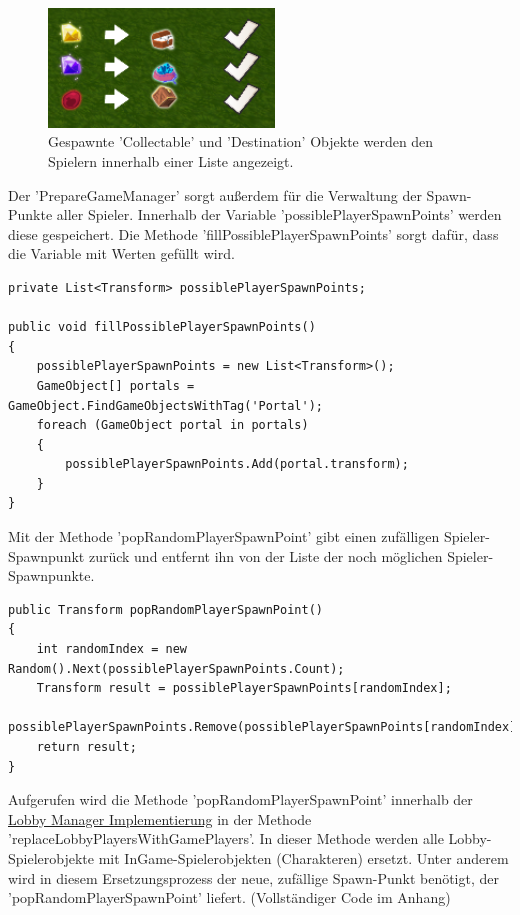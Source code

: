 \begin{figure}[H]
	\centering
	\includegraphics[width=60mm]{images/prototyp_task_list.png}
	\caption[Initial Task List]{Gespawnte 'Collectable' und 'Destination' Objekte werden den Spielern innerhalb einer Liste angezeigt.}
	\label{pic:prototyp_task_list}
\end{figure}

Der 'PrepareGameManager' sorgt außerdem für die Verwaltung der Spawn-Punkte aller Spieler. Innerhalb der Variable 'possiblePlayerSpawnPoints' werden diese gespeichert. Die Methode 'fillPossiblePlayerSpawnPoints' sorgt dafür, dass die Variable mit Werten gefüllt wird.

\begin{lstlisting}[caption= PrepareGameManager.cs fillPossiblePlayerSpawnPoints()]
private List<Transform> possiblePlayerSpawnPoints;

public void fillPossiblePlayerSpawnPoints()
{
	possiblePlayerSpawnPoints = new List<Transform>();
	GameObject[] portals = GameObject.FindGameObjectsWithTag('Portal');
	foreach (GameObject portal in portals)
	{
		possiblePlayerSpawnPoints.Add(portal.transform);
	}
}
\end{lstlisting}

Mit der Methode 'popRandomPlayerSpawnPoint' gibt einen zufälligen Spieler-Spawnpunkt zurück und entfernt ihn von der Liste der noch möglichen Spieler-Spawnpunkte.

\begin{lstlisting}[caption= PrepareGameManager.cs popRandomPlayerSpawnPoint()]
public Transform popRandomPlayerSpawnPoint()
{
	int randomIndex = new Random().Next(possiblePlayerSpawnPoints.Count);
	Transform result = possiblePlayerSpawnPoints[randomIndex];
	possiblePlayerSpawnPoints.Remove(possiblePlayerSpawnPoints[randomIndex]);
	return result;
}
\end{lstlisting}

Aufgerufen wird die Methode 'popRandomPlayerSpawnPoint' innerhalb der \hyperref[Lobby Manager Implementierung]{Lobby Manager Implementierung} in der Methode 'replaceLobbyPlayersWithGamePlayers'. In dieser Methode werden alle Lobby-Spielerobjekte mit InGame-Spielerobjekten (Charakteren) ersetzt. Unter anderem wird in diesem Ersetzungsprozess der neue, zufällige Spawn-Punkt benötigt, der 'popRandomPlayerSpawnPoint' liefert. (Vollständiger Code im Anhang)

